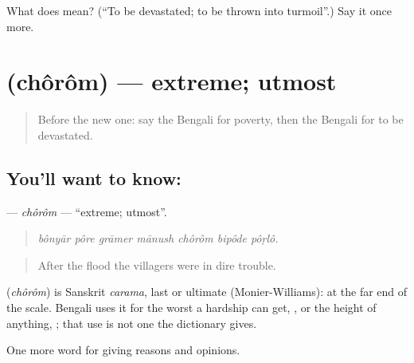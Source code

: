 \begin{tcolorbox}[breakable,colback=teal!4,colframe=teal!35!black,title={Before you move on}]
What does   mean? (\textquotedblleft{}To be devastated; to be thrown into turmoil\textquotedblright{}.) Say it once more.
\end{tcolorbox}
\section[\texorpdfstring{\bn{চরম} (chôrôm)}{চরম (chôrôm)}]{ (chôrôm) — extreme; utmost}

\label{lesson:BN-C364-chorom}



\begin{quote}
Before the new one: say the Bengali for poverty, then the Bengali for to be devastated.
\end{quote}

\subsection*{You'll want to know: }
\textbf{} — \emph{chôrôm} — \textquotedblleft{}extreme; utmost\textquotedblright{}.

\begin{quote}
      
\end{quote}

\begin{quote}
\emph{bônyār pôre grāmer mānush chôrôm bipôde pôṛlô.}
\end{quote}

\begin{quote}
After the flood the villagers were in dire trouble.
\end{quote}

\begin{cousinweb}
\textbf{} (\emph{chôrôm}) is Sanskrit \emph{carama}, last or ultimate (Monier-Williams): at the far end of the scale. Bengali uses it for the worst a hardship can get,  , or the height of anything,  ; that use is not one the dictionary gives.
\end{cousinweb}

\begin{grammarlens}[title={What you've built}]
One more word for giving reasons and opinions.
\end{grammarlens}

